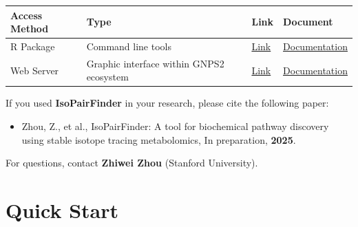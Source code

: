 \documentclass[
  letterpaper,
  DIV=11,
  numbers=noendperiod]{scrreprt}
\providecommand{\tightlist}{%
  \setlength{\itemsep}{0pt}\setlength{\parskip}{0pt}}
\begin{document}
\begin{longtable}[]{@{}
  >{\raggedright\arraybackslash}p{}
  >{\raggedright\arraybackslash}p{}
  >{\raggedright\arraybackslash}p{}
  >{\raggedright\arraybackslash}p{}@{}}
\toprule\noalign{}
\begin{minipage}[b]{\linewidth}\raggedright
Access Method
\end{minipage} & \begin{minipage}[b]{\linewidth}\raggedright
Type
\end{minipage} & \begin{minipage}[b]{\linewidth}\raggedright
Link
\end{minipage} & \begin{minipage}[b]{\linewidth}\raggedright
Document
\end{minipage} \\
\midrule\noalign{}
\endhead
\bottomrule\noalign{}
\endlastfoot
R Package & Command line tools &
\href{https://github.com/DoddLab/IsoPairFinder}{Link} &
\href{https://doddlab.github.io/IsoPairFinder_Tutorials/}{Documentation} \\
Web Server & Graphic interface within GNPS2 ecosystem &
\href{https://gnps2.org/workflowinput?workflowname=isopairfinder_nextflow_workflow}{Link}
&
\href{https://wang-bioinformatics-lab.github.io/GNPS2_Documentation/isopairfinder/}{Documentation} \\
\end{longtable}

If you used \textbf{IsoPairFinder} in your research, please cite the
following paper:

\begin{itemize}
\tightlist
\item
  Zhou, Z., et al., IsoPairFinder: A tool for biochemical pathway
  discovery using stable isotope tracing metabolomics, In preparation,
  \textbf{2025}.
\end{itemize}

For questions, contact \textbf{Zhiwei Zhou} (Stanford University).


\chapter{Quick Start}\label{sec-quick-start}
\end{document}
